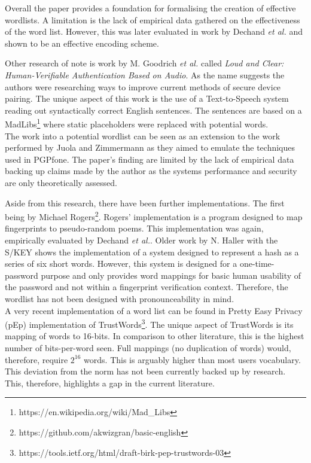 Overall the paper provides a foundation for formalising the creation of effective wordlists. A limitation is the lack of empirical data gathered on the effectiveness of the word list. However, this was later evaluated in work by Dechand \textit{et al.}
\cite{dechand2016empirical} and shown to be an effective encoding scheme.

Other research of note is work by M. Goodrich \textit{et al.}\cite{goodrich2006loud} called \textit{Loud and Clear: Human-Verifiable Authentication Based on Audio}. As the name suggests the authors were researching ways to improve current methods of secure device pairing. The unique aspect of this work is the use of a Text-to-Speech system reading out syntactically correct English sentences. The sentences are based on a MadLibs\footnote{https://en.wikipedia.org/wiki/Mad\_Libs} where static placeholders were replaced with potential words.\\
The work into a potential wordlist can be seen as an extension to the work performed by Juola and Zimmermann\cite{juola1996whole} as they aimed to emulate the techniques used in PGPfone. The paper's finding are limited by the lack of empirical data backing up claims made by the author as the systems performance and security are only theoretically assessed.

Aside from this research, there have been further implementations. The first being by Michael Rogers\footnote{https://github.com/akwizgran/basic-english}. Rogers' implementation is a program designed to map fingerprints to pseudo-random poems. This implementation was again, empirically evaluated by Dechand \textit{et al.}\cite{dechand2016empirical}. Older work by N. Haller with the S/KEY\cite{haller1995s} shows the implementation of a system designed to represent a hash as a series of six short words. However, this system is designed for a one-time-password purpose and only provides word mappings for basic human usability of the password and not within a fingerprint verification context. Therefore, the wordlist has not been designed with pronounceability in mind.
\\
A very recent implementation of a word list can be found in Pretty Easy Privacy (pEp) implementation of TrustWords\footnote{https://tools.ietf.org/html/draft-birk-pep-trustwords-03}. The unique aspect of TrustWords is its mapping of words to 16-bits. In comparison to other literature, this is the highest number of bits-per-word seen. Full mappings (no duplication of words) would, therefore, require $2^{16}$ words. This is arguably higher than most users vocabulary. This deviation from the norm has not been currently backed up by research. This, therefore, highlights a gap in the current literature.

